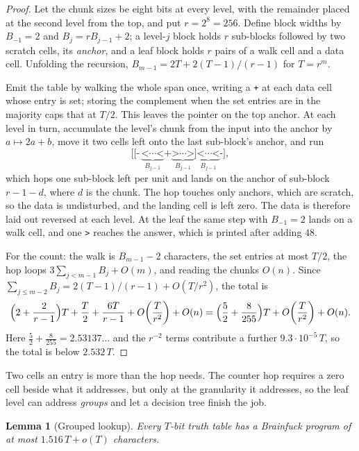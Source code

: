 \documentclass[11pt]{article}
\newtheorem{lemma}[theorem]{Lemma}
\theoremstyle{remark}
\begin{document}
\begin{proof}
Let the chunk sizes be eight bits at every level, with the remainder placed at
the second level from the top, and put $r=2^{8}=256$.  Define block widths by
$B_{-1}=2$ and $B_j=rB_{j-1}+2$; a level-$j$ block holds $r$ sub-blocks
followed by two scratch cells, its \emph{anchor}, and a leaf block holds $r$
pairs of a walk cell and a data cell.  Unfolding the recursion,
$B_{m-1}=2T+2(T-1)/(r-1)$ for $T=r^m$.

Emit the table by walking the whole span once, writing a \texttt{+} at each
data cell whose entry is set; storing the complement when the set entries are
in the majority caps that at $T/2$.  This leaves the pointer on the top
anchor.  At each level in turn, accumulate the level's chunk from the input
into the anchor by $a\mapsto2a+b$, move it two cells left onto the last
sub-block's anchor, and run
\[
  \texttt{[[-}\,\underbrace{\texttt{<}\cdots\texttt{<}}_{B_{j-1}}
  \texttt{+}\underbrace{\texttt{>}\cdots\texttt{>}}_{B_{j-1}}
  \texttt{]}\underbrace{\texttt{<}\cdots\texttt{<}}_{B_{j-1}}\texttt{-]},
\]
which hops one sub-block left per unit and lands on the anchor of sub-block
$r-1-d$, where $d$ is the chunk.  The hop touches only anchors, which are
scratch, so the data is undisturbed, and the landing cell is left zero.  The
data is therefore laid out reversed at each level.  At the leaf the same step
with $B_{-1}=2$ lands on a walk cell, and one \texttt{>} reaches the answer,
which is printed after adding $48$.

For the count: the walk is $B_{m-1}-2$ characters, the set entries at most
$T/2$, the hop loops $3\sum_{j<m-1}B_j+O(m)$, and reading the chunks
$O(n)$.  Since $\sum_{j\le m-2}B_j=2(T-1)/(r-1)+O(T/r^2)$, the total is
\[
  \Bigl(2+\frac{2}{r-1}\Bigr)T+\frac{T}{2}
  +\frac{6T}{r-1}+O\!\left(\frac{T}{r^2}\right)+O(n)
  =\Bigl(\frac52+\frac{8}{255}\Bigr)T+O\!\left(\frac{T}{r^2}\right)+O(n).
\]
Here $\frac52+\frac{8}{255}=2.53137\ldots$ and the $r^{-2}$ terms contribute
a further $9.3\cdot10^{-5}\,T$, so the total is below $2.532\,T$.
\end{proof}

Two cells an entry is more than the hop needs.  The counter hop requires a
zero cell beside what it addresses, but only at the granularity it
addresses, so the leaf level can address \emph{groups} and let a decision
tree finish the job.

\begin{lemma}[Grouped lookup]\label{lem:group}
Every $T$-bit truth table has a Brainfuck program of at most
$1.516\,T+o(T)$ characters.
\end{lemma}
\end{document}
